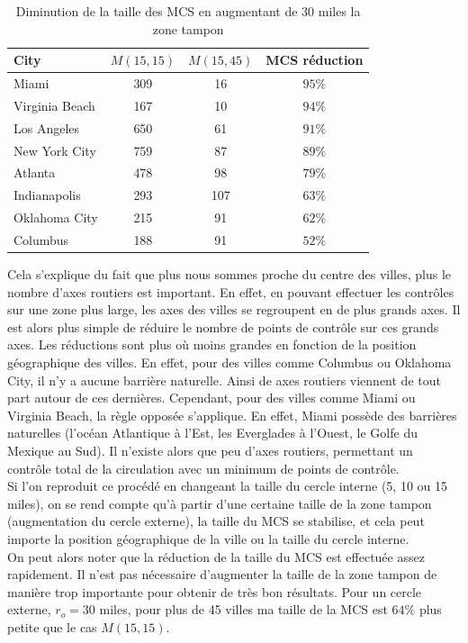 \begin{table}[H]
 \centering
 \begin{tabular}{|l|c|c|c|}
    \toprule
    \textbf{City} & \textbf{$M(15,15)$} & \textbf{$M(15,45)$} & \textbf{MCS réduction}\\\midrule
    Miami & 309 & 16 & $95\%$ \\\hline
    Virginia Beach & 167 & 10 & $94\%$ \\\hline
    Los Angeles & 650 & 61 & $91\%$ \\\hline
    New York City & 759 & 87 & $89\%$ \\\hline
    Atlanta & 478 & 98 & $79\%$ \\\hline
    Indianapolis & 293 & 107 & $63\%$ \\\hline
    Oklahoma City & 215 & 91 & $62\%$ \\\hline
    Columbus & 188 & 91 & $52\%$ \\\bottomrule
 \end{tabular}
 \caption{Diminution de la taille des MCS en augmentant de 30 miles la zone tampon}
 \label{tab:1}
\end{table}
Cela s'explique du fait que plus nous sommes proche du centre des villes, plus le nombre d'axes routiers est important. En effet, en pouvant effectuer les contrôles sur une zone plus large, les axes des villes se regroupent en de plus grands axes. Il est alors plus simple de réduire le nombre de points de contrôle sur ces grands axes. Les réductions sont plus où moins grandes en fonction de la position géographique des villes. En effet, pour des villes comme Columbus ou Oklahoma City, il n'y a aucune barrière naturelle. Ainsi de axes routiers viennent de tout part autour de ces dernières. Cependant, pour des villes comme Miami ou Virginia Beach, la règle opposée s'applique. En effet, Miami possède des barrières naturelles (l'océan Atlantique à l'Est, les Everglades à l'Ouest, le Golfe du Mexique au Sud). Il n'existe alors que peu d'axes routiers, permettant un contrôle total de la circulation avec un minimum de points de contrôle.\\
Si l'on reproduit ce procédé en changeant la taille du cercle interne (5, 10 ou 15 miles), on se rend compte qu'à partir d'une certaine taille de la zone tampon (augmentation du cercle externe), la taille du MCS se stabilise, et cela peut importe la position géographique de la ville ou la taille du cercle interne.\\
On peut alors noter que la réduction de la taille du MCS est effectuée assez rapidement. Il n'est pas nécessaire d'augmenter la taille de la zone tampon de manière trop importante pour obtenir de très bon résultats. Pour un cercle externe, $r_o=30$ miles, pour plus de 45 villes ma taille de la MCS est $64\%$ plus petite que le cas $M(15,15)$.\\~\\\par

